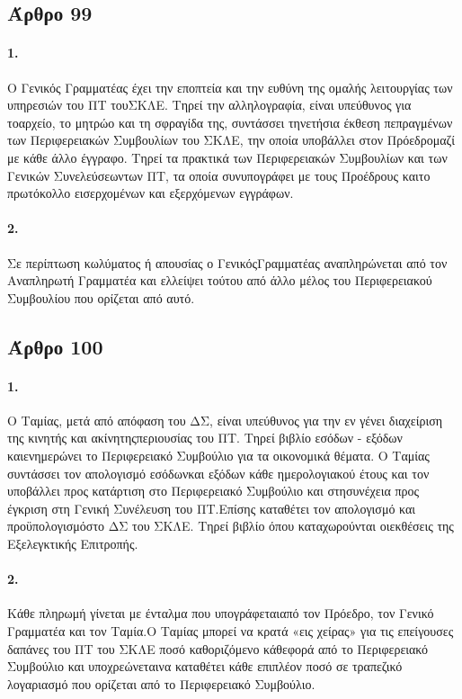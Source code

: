 \documentclass[a4paper,oneside, 10pt]{book}
\begin{document}
\subsection*{ Άρθρο 99 }
\paragraph { 1. } Ο Γενικός Γραμματέας έχει την εποπτεία και την ευθύνη της ομαλής λειτουργίας των υπηρεσιών του ΠΤ τουΣΚΛΕ. Τηρεί την αλληλογραφία, είναι υπεύθυνος για τοαρχείο, το μητρώο και τη σφραγίδα της, συντάσσει τηνετήσια έκθεση πεπραγμένων των Περιφερειακών Συμβουλίων του ΣΚΛΕ, την οποία υποβάλλει στον Πρόεδρομαζί με κάθε άλλο έγγραφο. Τηρεί τα πρακτικά των Περιφερειακών Συμβουλίων και των Γενικών Συνελεύσεωντων ΠΤ, τα οποία συνυπογράφει με τους Προέδρους καιτο πρωτόκολλο εισερχομένων και εξερχόμενων εγγράφων.
\paragraph { 2. } Σε περίπτωση κωλύματος ή απουσίας ο ΓενικόςΓραμματέας αναπληρώνεται από τον Αναπληρωτή Γραμματέα και ελλείψει τούτου από άλλο μέλος του Περιφερειακού Συμβουλίου που ορίζεται από αυτό.
\subsection*{ Άρθρο 100 }
\paragraph { 1. } Ο Ταμίας, μετά από απόφαση του ΔΣ, είναι υπεύθυνος για την εν γένει διαχείριση της κινητής και ακίνητηςπεριουσίας του ΠΤ. Τηρεί βιβλίο εσόδων - εξόδων καιενημερώνει το Περιφερειακό Συμβούλιο για τα οικονομικά θέματα. Ο Ταμίας συντάσσει τον απολογισμό εσόδωνκαι εξόδων κάθε ημερολογιακού έτους και τον υποβάλλει προς κατάρτιση στο Περιφερειακό Συμβούλιο και στησυνέχεια προς έγκριση στη Γενική Συνέλευση του ΠΤ.Επίσης καταθέτει τον απολογισμό και προϋπολογισμόστο ΔΣ του ΣΚΛΕ. Τηρεί βιβλίο όπου καταχωρούνται οιεκθέσεις της Εξελεγκτικής Επιτροπής.
\paragraph { 2. } Κάθε πληρωμή γίνεται με ένταλμα που υπογράφεταιαπό τον Πρόεδρο, τον Γενικό Γραμματέα και τον Ταμία.Ο Ταμίας μπορεί να κρατά «εις χείρας» για τις επείγουσες δαπάνες του ΠΤ του ΣΚΛΕ ποσό καθοριζόμενο κάθεφορά από το Περιφερειακό Συμβούλιο και υποχρεώνεταινα καταθέτει κάθε επιπλέον ποσό σε τραπεζικό λογαριασμό που ορίζεται από το Περιφερειακό Συμβούλιο.
\end{document}

